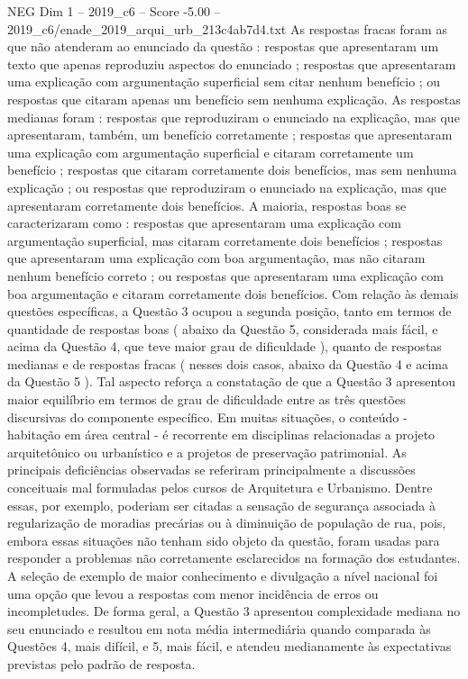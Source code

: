 \begin{textsample}{NEG Dim 1 – 2019\_c6 – Score -5.00 – 2019\_c6/enade\_2019\_arqui\_urb\_213c4ab7d4.txt}
As respostas fracas foram as que não atenderam ao enunciado da questão : respostas que apresentaram um texto que apenas reproduziu aspectos do enunciado ; respostas que apresentaram uma explicação com argumentação superficial sem citar nenhum benefício ; ou respostas que citaram apenas um benefício sem nenhuma explicação.
As respostas medianas foram : respostas que reproduziram o enunciado na explicação, mas que apresentaram, também, um benefício corretamente ; respostas que apresentaram uma explicação com argumentação superficial e citaram corretamente um benefício ; respostas que citaram corretamente dois benefícios, mas sem nenhuma explicação ; ou respostas que reproduziram o enunciado na explicação, mas que apresentaram corretamente dois benefícios.
A maioria, respostas boas se caracterizaram como : respostas que apresentaram uma explicação com argumentação superficial, mas citaram corretamente dois benefícios ; respostas que apresentaram uma explicação com boa argumentação, mas não citaram nenhum benefício correto ; ou respostas que apresentaram uma explicação com boa argumentação e citaram corretamente dois benefícios.
Com relação às demais questões específicas, a Questão 3 ocupou a segunda posição, tanto em termos de quantidade de respostas boas ( abaixo da Questão 5, considerada mais fácil, e acima da Questão 4, que teve maior grau de dificuldade ), quanto de respostas medianas e de respostas fracas ( nesses dois casos, abaixo da Questão 4 e acima da Questão 5 ).
Tal aspecto reforça a constatação de que a Questão 3 apresentou maior equilíbrio em termos de grau de dificuldade entre as três questões discursivas do componente específico.
Em muitas situações, o conteúdo - habitação em área central - é recorrente em disciplinas relacionadas a projeto arquitetônico ou urbanístico e a projetos de preservação patrimonial.
As principais deficiências observadas se referiram principalmente a discussões conceituais mal formuladas pelos cursos de Arquitetura e Urbanismo.
Dentre essas, por exemplo, poderiam ser citadas a sensação de segurança associada à regularização de moradias precárias ou à diminuição de população de rua, pois, embora essas situações não tenham sido objeto da questão, foram usadas para responder a problemas não corretamente esclarecidos na formação dos estudantes.
A seleção de exemplo de maior conhecimento e divulgação a nível nacional foi uma opção que levou a respostas com menor incidência de erros ou incompletudes.
De forma geral, a Questão 3 apresentou complexidade mediana no seu enunciado e resultou em nota média intermediária quando comparada às Questões 4, mais difícil, e 5, mais fácil, e atendeu medianamente às expectativas previstas pelo padrão de resposta.

\end{textsample}
